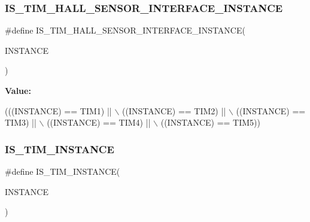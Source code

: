 \subsubsection{\texorpdfstring{I\+S\+\_\+\+T\+I\+M\+\_\+\+H\+A\+L\+L\+\_\+\+S\+E\+N\+S\+O\+R\+\_\+\+I\+N\+T\+E\+R\+F\+A\+C\+E\+\_\+\+I\+N\+S\+T\+A\+N\+CE}{IS\_TIM\_HALL\_SENSOR\_INTERFACE\_INSTANCE}}
{\footnotesize\ttfamily \#define I\+S\+\_\+\+T\+I\+M\+\_\+\+H\+A\+L\+L\+\_\+\+S\+E\+N\+S\+O\+R\+\_\+\+I\+N\+T\+E\+R\+F\+A\+C\+E\+\_\+\+I\+N\+S\+T\+A\+N\+CE(\begin{DoxyParamCaption}\item[{}]{I\+N\+S\+T\+A\+N\+CE }\end{DoxyParamCaption})}

{\bfseries Value\+:}
\begin{DoxyCode}
(((INSTANCE) == TIM1) || \(\backslash\)
                                                          ((INSTANCE) == TIM2) || \(\backslash\)
                                                          ((INSTANCE) == TIM3) || \(\backslash\)
                                                          ((INSTANCE) == TIM4) || \(\backslash\)
                                                          ((INSTANCE) == TIM5))
\end{DoxyCode}
\mbox{\label{group___exported__macros_gaba506eb03409b21388d7c5a6401a4f98}} 
\subsubsection{\texorpdfstring{I\+S\+\_\+\+T\+I\+M\+\_\+\+I\+N\+S\+T\+A\+N\+CE}{IS\_TIM\_INSTANCE}}
{\footnotesize\ttfamily \#define I\+S\+\_\+\+T\+I\+M\+\_\+\+I\+N\+S\+T\+A\+N\+CE(\begin{DoxyParamCaption}\item[{}]{I\+N\+S\+T\+A\+N\+CE }\end{DoxyParamCaption})}

